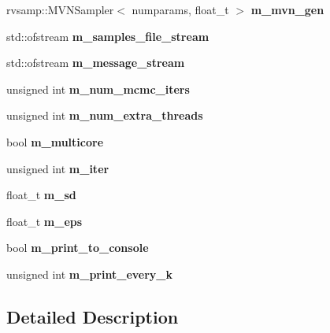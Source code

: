 \begin{DoxyCompactItemize}
rvsamp\+::\+M\+V\+N\+Sampler$<$ numparams, float\+\_\+t $>$ {\bfseries m\+\_\+mvn\+\_\+gen}
\item 
\mbox{\label{classada__pmmh__mvn_aa2f05575406feb4bc2e7ed97d9edb703}} 
std\+::ofstream {\bfseries m\+\_\+samples\+\_\+file\+\_\+stream}
\item 
\mbox{\label{classada__pmmh__mvn_ad04a7bd0a0cf81836cbc3934b2b40ece}} 
std\+::ofstream {\bfseries m\+\_\+message\+\_\+stream}
\item 
\mbox{\label{classada__pmmh__mvn_a653603682a96d0f30c82f5f5bd83503e}} 
unsigned int {\bfseries m\+\_\+num\+\_\+mcmc\+\_\+iters}
\item 
\mbox{\label{classada__pmmh__mvn_a508a228e3effb586bbf2fdc38c5dfaf9}} 
unsigned int {\bfseries m\+\_\+num\+\_\+extra\+\_\+threads}
\item 
\mbox{\label{classada__pmmh__mvn_ae5afb1ceaa3f6173f3b12c2d492105ad}} 
bool {\bfseries m\+\_\+multicore}
\item 
\mbox{\label{classada__pmmh__mvn_a06b5eed1ebb523262ec69e46bc70393d}} 
unsigned int {\bfseries m\+\_\+iter}
\item 
\mbox{\label{classada__pmmh__mvn_ad33ac891e9fb4bd9b59185d874d05301}} 
float\+\_\+t {\bfseries m\+\_\+sd}
\item 
\mbox{\label{classada__pmmh__mvn_abaf7185b58d25568b0032903e5fc1748}} 
float\+\_\+t {\bfseries m\+\_\+eps}
\item 
\mbox{\label{classada__pmmh__mvn_a9f1b4d3880798e8f0d72728f51fbaf32}} 
bool {\bfseries m\+\_\+print\+\_\+to\+\_\+console}
\item 
\mbox{\label{classada__pmmh__mvn_ab1eb75f119d61924cdbfa9b00c07d795}} 
unsigned int {\bfseries m\+\_\+print\+\_\+every\+\_\+k}
\end{DoxyCompactItemize}


\subsection{Detailed Description}
